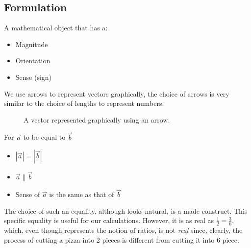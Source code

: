 
\subsection{Formulation}
\label{sub:vector-formulation}

\begin{definition}[Vector]
    A mathematical object that has a:
    \begin{itemize}
        \item Magnitude
        \item Orientation
        \item Sense (sign)
    \end{itemize}
\end{definition}

We use arrows to represent vectors graphically, the choice of arrows is very similar to the choice of lengths to represent numbers.

\begin{figure}[H]
    \begin{center}
    \end{center}
    \caption{A vector represented graphically using an arrow.}%
    \label{fig:vector}
\end{figure}

\begin{definition}
    For $\vec{a}$ to be equal to $\vec{b}$
    \begin{itemize}
        \item $|\vec{a}| = |\vec{b}|$
        \item $\vec{a} \parallel \vec{b}$
        \item Sense of $\vec{a}$ is the same as that of $\vec{b}$
    \end{itemize}
\end{definition}

The choice of such an equality, although looks natural, is a made construct. This specific equality is useful for our calculations. However, it is as real as $\frac{1}{2}=\frac{3}{6}$, which, even though represents the notion of ratios, is not \textit{real} since, clearly, the process of cutting a pizza into 2 pieces is different from cutting it into 6 piece.


